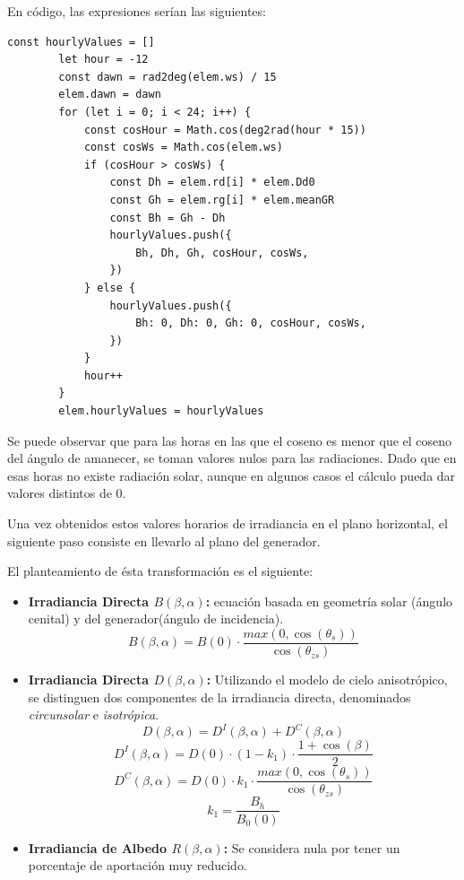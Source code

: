 En código, las expresiones serían las siguientes:

\begin{lstlisting}[style=ES6, caption={Cálculo de rG}]
		const hourlyValues = []
		let hour = -12
		const dawn = rad2deg(elem.ws) / 15
		elem.dawn = dawn
		for (let i = 0; i < 24; i++) {
			const cosHour = Math.cos(deg2rad(hour * 15))
			const cosWs = Math.cos(elem.ws)
			if (cosHour > cosWs) {
				const Dh = elem.rd[i] * elem.Dd0
				const Gh = elem.rg[i] * elem.meanGR
				const Bh = Gh - Dh
				hourlyValues.push({
					Bh, Dh, Gh, cosHour, cosWs,
				})
			} else {
				hourlyValues.push({
					Bh: 0, Dh: 0, Gh: 0, cosHour, cosWs,
				})
			}
			hour++
		}
		elem.hourlyValues = hourlyValues
\end{lstlisting}

Se puede observar que para las horas en las que el coseno es menor que el coseno del ángulo de amanecer, se toman valores nulos para las radiaciones. Dado que en esas horas no existe radiación solar, aunque en algunos casos el cálculo pueda dar valores distintos de 0.

Una vez obtenidos estos valores horarios de irradiancia en el plano horizontal, el siguiente paso consiste en llevarlo al plano del generador.

El planteamiento de ésta transformación es el siguiente:
\begin{itemize}
\item \textbf{Irradiancia Directa $B(\beta,\alpha)$:} ecuación basada en geometría solar (ángulo cenital) y del generador(ángulo de incidencia).
\begin{equation}
\label{eqn:B_beta_alpha}
B(\beta,\alpha) = B(0) \cdot \frac{max(0,\cos(\theta_s))}{\cos(\theta_{zs})}
\end{equation}
\item \textbf{Irradiancia Directa $D(\beta,\alpha)$:} Utilizando el modelo de cielo anisotrópico, se distinguen dos componentes de la irradiancia directa, denominados \textit{circunsolar} e \textit{isotrópica}.
\begin{equation}
D(\beta,\alpha) = D^I(\beta,\alpha)+D^C(\beta,\alpha)
\end{equation}
\begin{equation}
D^I(\beta,\alpha) = D(0)\cdot(1-k_1)\cdot\frac{1+\cos(\beta)}{2}
\end{equation}
\begin{equation}
D^C(\beta,\alpha) = D(0)\cdot k_1 \cdot \frac{max(0, \cos(\theta_s))}{\cos(\theta_{zs})}
\end{equation}
\begin{equation}
k_1 = \frac{B_h}{B_0(0)}
\end{equation}
\item \textbf{Irradiancia de Albedo $R(\beta,\alpha)$:} Se considera nula por tener un porcentaje de aportación muy reducido.
\end{itemize}

